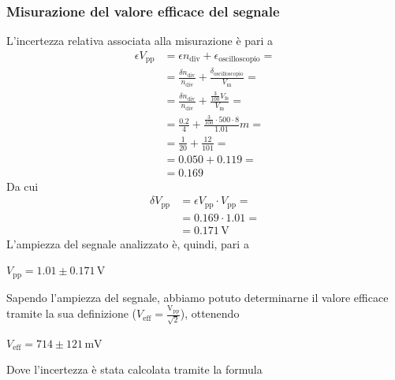 \documentclass{article}
\begin{document}
			\subsubsection{Misurazione del valore efficace del segnale}
				L'incertezza relativa associata alla misurazione è pari a 
				\begin{equation*}
					\begin{split}
						\epsilon V_{\mathrm{pp}} &= \epsilon n_{\mathrm{div}} + \epsilon_{\mathrm{oscilloscopio}} = \\
												 &= \frac{\delta n_{\mathrm{div}}}{n_{\mathrm{div}}} + \frac{\delta_{\mathrm{oscilloscopio}}}{V_{\mathrm{m}}} = \\
												 &= \frac{\delta n_{\mathrm{div}}}{n_{\mathrm{div}}} + \frac{\frac{3}{100}V_{\mathrm{fs}}}{V_{\mathrm{m}}} = \\
												 &= \frac{0.2}{4} + \frac{\frac{3}{100} \cdot 500 \cdot 8}{1.01}m = \\
												 &= \frac{1}{20} + \frac{12}{101} = \\
												 &= 0.050 + 0.119 = \\
												 &= 0.169
					\end{split}
				\end{equation*}
				Da cui
				\begin{equation*}
					\begin{split}
						\delta V_{\mathrm{pp}} &= \epsilon V_{\mathrm{pp}} \cdot V_{\mathrm{pp}} = \\
											   &= 0.169 \cdot 1.01 = \\
											   &= 0.171 \, \mathrm{V}
					\end{split}
				\end{equation*}
				L'ampiezza del segnale analizzato è, quindi, pari a
				\newline
				\begin{center}
					$ V_{\mathrm{pp}} = 1.01 \pm 0.171 \, \mathrm{V} $
				\end{center}
				\newline
				Sapendo l'ampiezza del segnale, abbiamo potuto determinarne il valore efficace tramite la sua definizione ($ V_{\mathrm{eff}} = \mathrm{\frac{V_{pp}}{\sqrt{2}}} $), ottenendo
				\newline
				\begin{center}
					$ V_{\mathrm{eff}} = 714 \pm 121 \, \mathrm{mV} $
				\end{center}
				\newline
				Dove l'incertezza è stata calcolata tramite la formula
\end{document}
